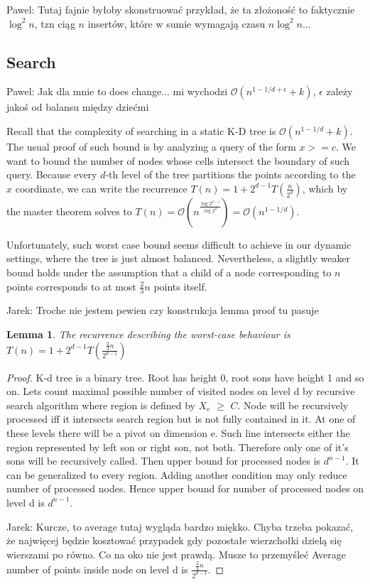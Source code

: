 \documentclass[10pt,a4paper]{article}
\newtheorem{lemma}{Lemma}
\newcommand{\pawel}[1]{\noindent\colorbox{myRed}{Pawel: #1}}
\newcommand{\jarek}[1]{\noindent\colorbox{myYellow}{Jarek: #1}}
\newcommand{\Oh}{\mathcal{O}}
\begin{document}
\pawel{Tutaj fajnie byłoby skonstruować przykład, że ta złożoność to faktycznie $\log^{2}n$, tzn ciąg $n$ insertów, które w sumie wymagają czasu $n\log^{2}n$...}

\subsection{Search}
\pawel{Jak dla mnie to does change... mi wychodzi $\Oh(n^{1-1/d+\epsilon}+k)$, $\epsilon$ zależy jakoś od balansu między dziećmi}

Recall that the complexity of searching in a static K-D tree is $\Oh(n^{1-1/d} + k)$. The usual proof of such bound is by analyzing a query of the form $x>=c$. We want to bound the number of nodes whose cells intersect the boundary of such query. Because every $d$-th level of the tree partitions the points according to the $x$ coordinate, we can write the recurrence $T(n)=1+2^{d-1}T(\frac{n}{2^{d}})$, which by the master theorem solves to $T(n)=\Oh(n^{\frac{\log 2^{d-1}}{\log 2^{d}}})=\Oh(n^{1-1/d})$. 

Unfortunately, such worst case bound seems difficult to achieve in our dynamic settings, where the tree is just almost balanced. Nevertheless, a slightly weaker bound holds under the assumption that a child of a node corresponding to $n$ points corresponds to at most $\frac{2}{3}n$ points itself.

\jarek{Troche nie jestem pewien czy konstrukcja lemma proof tu pasuje}
\begin{lemma}\label{lem:3}
The recurrence describing the worst-case behaviour is $T(n)=1+2^{d-1}T(\frac{\frac{2}{3}n}{2^{d-1}})$
\end{lemma}

\begin{proof}

K-d tree is a binary tree. Root has height 0, root sons have height 1 and so on. Lets count maximal possible number of visited nodes on level d by recursive search algorithm where region is defined by $X_e$ $\geq$ $C$. Node will be recursively processed iff it intersects search region but is not fully contained in it. At one of these levels there will be a pivot on dimension e. Such line intersects either the region represented by left son or right son, not both. Therefore only one of it's sons will be recursively called. Then upper bound for processed nodes is $d^{n-1}$. It can be generalized to every region. Adding another condition may only reduce number of processed nodes. Hence upper bound for number of processed nodes on level d is $d^{n-1}$. 

\jarek{Kurcze, to average tutaj wygląda bardzo miękko. Chyba trzeba pokazać, że najwięcej będzie kosztować przypadek gdy pozostałe wierzchołki dzielą się wierszami po równo. Co na oko nie jest prawdą. Musze to przemyśleć}
Average number of points inside node on level d is $\frac{\frac{2}{3}n}{2^{d-1}}$. 

\end{proof}
\end{document}

